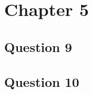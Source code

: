 \documentclass{article}
\begin{document}
\section*{Chapter 5}
\subsection*{Question 9}
\subsection*{Question 10}
\end{document}
